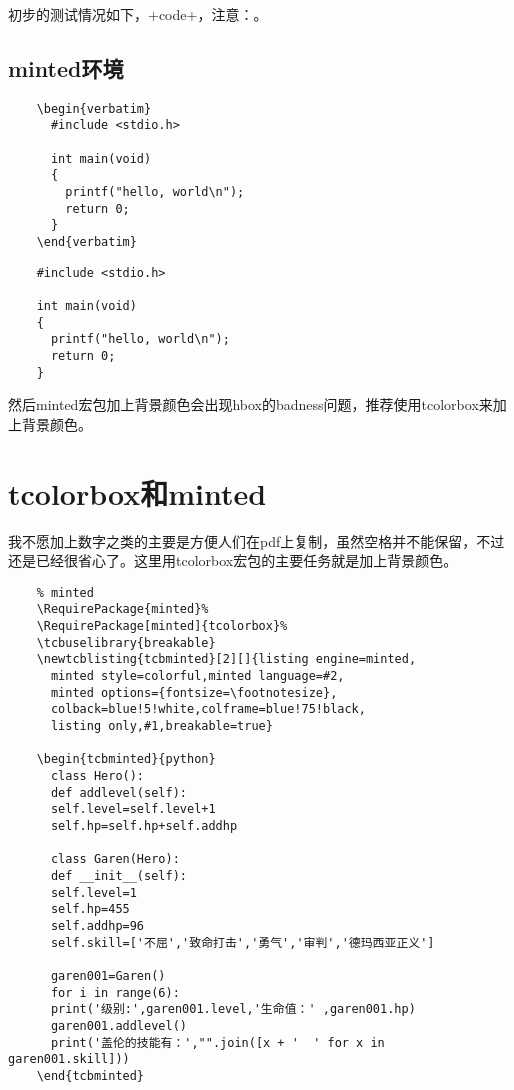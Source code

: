 \documentclass[11pt,oneside]{book}
\begin{document}
  初步的测试情况如下，+\test code+，注意：。

  \subsection{minted环境}
  \begin{Verbatim}
    \begin{verbatim}
      #include <stdio.h>

      int main(void)
      {
        printf("hello, world\n");
        return 0;
      }
    \end{verbatim}
  \end{Verbatim}

  \begin{verbatim}
    #include <stdio.h>

    int main(void)
    {
      printf("hello, world\n");
      return 0;
    }
  \end{verbatim}

  然后minted宏包加上背景颜色会出现hbox的badness问题，推荐使用tcolorbox来加上背景颜色。


  \section{tcolorbox和minted}
  我不愿加上数字之类的主要是方便人们在pdf上复制，虽然空格并不能保留，不过还是已经很省心了。这里用tcolorbox宏包的主要任务就是加上背景颜色。

  \begin{Verbatim}
    % minted
    \RequirePackage{minted}%
    \RequirePackage[minted]{tcolorbox}%
    \tcbuselibrary{breakable}
    \newtcblisting{tcbminted}[2][]{listing engine=minted,
      minted style=colorful,minted language=#2,
      minted options={fontsize=\footnotesize},
      colback=blue!5!white,colframe=blue!75!black,
      listing only,#1,breakable=true}

    \begin{tcbminted}{python}
      class Hero():
      def addlevel(self):
      self.level=self.level+1
      self.hp=self.hp+self.addhp

      class Garen(Hero):
      def __init__(self):
      self.level=1
      self.hp=455
      self.addhp=96
      self.skill=['不屈','致命打击','勇气','审判','德玛西亚正义']

      garen001=Garen()
      for i in range(6):
      print('级别:',garen001.level,'生命值：' ,garen001.hp)
      garen001.addlevel()
      print('盖伦的技能有：',"".join([x + '  ' for x in garen001.skill]))
    \end{tcbminted}
  \end{Verbatim}
\end{document}
